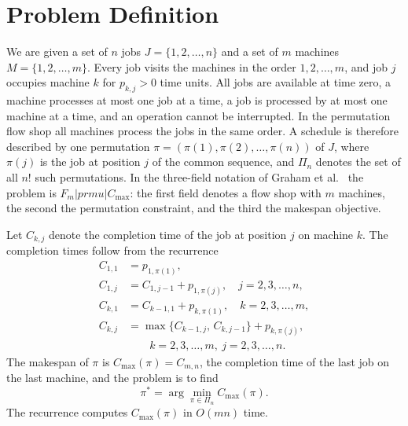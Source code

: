 \documentclass[10pt,twoside,twocolumn,a4paper]{article}
\newif\ifrevmarks \revmarksfalse
\newenvironment{revblock}{\ifrevmarks\color{red}\fi}{}
\begin{document}
\section{Problem Definition}\label{sec:problem}
\begin{revblock}
We are given a set of $n$ jobs $J=\{1,2,\dots,n\}$ and a set of $m$ machines $M=\{1,2,\dots,m\}$. Every job visits the machines in the order $1,2,\dots,m$, and job $j$ occupies machine $k$ for $p_{k,j}>0$ time units. All jobs are available at time zero, a machine processes at most one job at a time, a job is processed by at most one machine at a time, and an operation cannot be interrupted. In the permutation flow shop all machines process the jobs in the same order. A schedule is therefore described by one permutation $\pi=(\pi(1),\pi(2),\dots,\pi(n))$ of $J$, where $\pi(j)$ is the job at position $j$ of the common sequence, and $\Pi_n$ denotes the set of all $n!$ such permutations. In the three-field notation of Graham et al.~\cite{Graham1979} the problem is $F_m|prmu|C_{\max}$: the first field denotes a flow shop with $m$ machines, the second the permutation constraint, and the third the makespan objective.

Let $C_{k,j}$ denote the completion time of the job at position $j$ on machine $k$. The completion times follow from the recurrence
\begin{align}
C_{1,1} &= p_{1,\pi(1)}, \label{eq:C11}\\
C_{1,j} &= C_{1,j-1}+p_{1,\pi(j)}, \quad j=2,3,\dots,n, \label{eq:C1j}\\
C_{k,1} &= C_{k-1,1}+p_{k,\pi(1)}, \quad k=2,3,\dots,m, \label{eq:Ck1}\\
C_{k,j} &= \max\{C_{k-1,j},\,C_{k,j-1}\}+p_{k,\pi(j)}, \nonumber\\
&\qquad k=2,3,\dots,m,\ j=2,3,\dots,n. \label{eq:Ckj}
\end{align}
The makespan of $\pi$ is $C_{\max}(\pi)=C_{m,n}$, the completion time of the last job on the last machine, and the problem is to find
\begin{equation}\label{eq:obj}
\pi^* = \arg\min_{\pi\in\Pi_n} C_{\max}(\pi).
\end{equation}
The recurrence computes $C_{\max}(\pi)$ in $O(mn)$ time.
\end{revblock}
\end{document}
